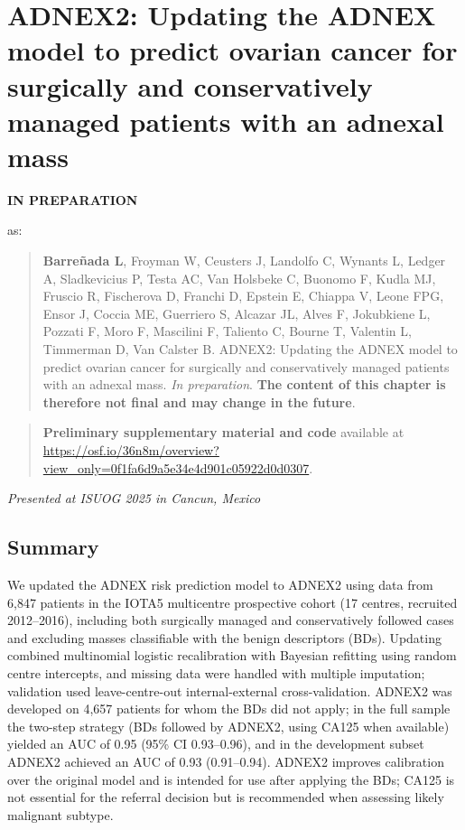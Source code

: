 \chapter[ADNEX2: Updating the ADNEX model]{ADNEX2: Updating the ADNEX model to predict ovarian cancer for
surgically and conservatively managed patients with an adnexal mass}
\label{sec:chp_ADNEX2}


\begin{flushleft}
{\huge\sffamily \textbf{IN PREPARATION}}
\end{flushleft}
as:
\begin{quote}
\textbf{Barreñada L}, Froyman W, Ceusters J, Landolfo C, Wynants L, Ledger A, Sladkevicius P, Testa AC, Van Holsbeke C, Buonomo F, Kudla MJ, Fruscio R, Fischerova D, Franchi D, Epstein E, Chiappa V, Leone FPG, Ensor J, Coccia ME, Guerriero S, Alcazar JL, Alves F, Jokubkiene L, Pozzati F, Moro F, Mascilini F, Taliento C, Bourne T, Valentin L, Timmerman D, Van Calster B. ADNEX2: Updating the ADNEX model to predict ovarian cancer for surgically and conservatively managed patients with an adnexal mass. \textit{In preparation}. \textbf{The content of this chapter is therefore not final and may change in the future}.
\end{quote}

\begin{quote}
\textbf{Preliminary supplementary material and code} available at \url{https://osf.io/36n8m/overview?view_only=0f1fa6d9a5e34e4d901c05922d0d0307}.
\end{quote}
\vspace{0.2em}
\noindent\scriptsize\textit{Presented at ISUOG 2025 in Cancun, Mexico}
\vspace{-0.5em}
\normalsize\vspace{-0.5em}

\section*{Summary}\label{abstract}

We updated the \gls{ADNEX} risk prediction model to ADNEX2 using data from 6,847 patients in the IOTA5 multicentre prospective cohort (17 centres, recruited 2012–2016), including both surgically managed and conservatively followed cases and excluding masses classifiable with the benign descriptors (BDs). Updating combined multinomial logistic recalibration with Bayesian refitting using random centre intercepts, and missing data were handled with multiple imputation; validation used leave-centre-out internal-external cross-validation. ADNEX2 was developed on 4,657 patients for whom the BDs did not apply; in the full sample the two-step strategy (BDs followed by ADNEX2, using CA125 when available) yielded an AUC of 0.95 (95\% CI 0.93–0.96), and in the development subset ADNEX2 achieved an AUC of 0.93 (0.91–0.94). ADNEX2 improves calibration over the original model and is intended for use after applying the BDs; CA125 is not essential for the referral decision but is recommended when assessing likely malignant subtype.

